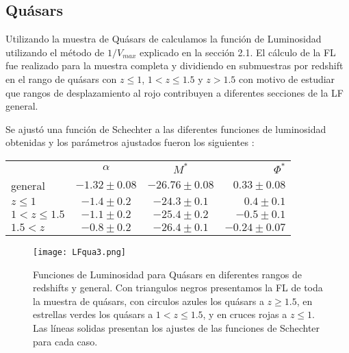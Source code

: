 \documentclass[a4paper,10pt]{article}
\begin{document}
\subsection{Qu\'asars}
Utilizando la muestra de Qu\'asars de \citet{Zandivarez2009} calculamos la funci\'on de Luminosidad utilizando el m\'etodo de $1/V_{max}$ explicado en la secci\'on 2.1. El c\'alculo de la FL fue realizado para la muestra completa y dividiendo en submuestras por redshift en el rango de qu\'asars con $z\leq1$, $1<z\leq1.5$ y $z>1.5$   con motivo de estudiar que rangos de desplazamiento al rojo contribuyen a diferentes secciones de la LF general. 

Se ajust\'o una funci\'on de Schechter a las diferentes funciones de luminosidad obtenidas y los par\'ametros ajustados fueron los siguientes : 

\begin{tabular}{| l | c | c | r | }
 \hline			
    & $\alpha$ & $M^{\ast}$ & $\Phi^{\ast}$ \\
   general & $-1.32\pm0.08$ & $-26.76\pm0.08$ & $0.33\pm0.08$\\
   $z\leq1 $& $-1.4\pm0.2$ &$ -24.3\pm0.1$ & $0.4\pm0.1$ \\
 $1<z\leq1.5$ &$ -1.1\pm0.2 $& $-25.4\pm0.2$ & $-0.5\pm0.1$\\
 $ 1.5<z$ & $-0.8\pm0.2$ & $-26.4\pm0.1$ & $-0.24\pm0.07$\\
   \hline  
 \end{tabular}

\begin{figure}[h]
 \centering
 \texttt{[image: LFqua3.png]}
 \caption{Funciones de Luminosidad para Qu\'asars en diferentes rangos de redshifts y general. Con triangulos negros presentamos la FL de toda la muestra de qu\'asars, con circulos azules los qu\'asars a $z\geq1.5$, en estrellas verdes los qu\'asars a $1<z\leq1.5$, y en cruces rojas a  $z\leq1$. Las l\'ineas solidas presentan los ajustes de las funciones de Schechter para cada caso.}
 \label{fig:2}
\end{figure}
 
\end{document}
